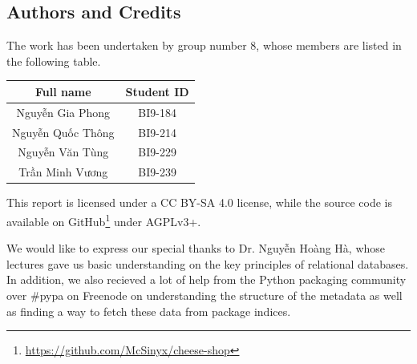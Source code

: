 \documentclass[a4paper,12pt]{article}
\begin{document}
\subsection{Authors and Credits}
The work has been undertaken by group number 8, whose members are listed
in the following table.
\begin{center}
  \begin{tabular}{c c}
    \toprule
    Full name & Student ID\\
    \midrule
    Nguyễn Gia Phong & BI9-184\\
    Nguyễn Quốc Thông & BI9-214\\
    Nguyễn Văn Tùng & BI9-229\\
    Trần Minh Vương & BI9-239\\
    \bottomrule
  \end{tabular}
\end{center}

This report is licensed under a CC BY-SA 4.0 license, while the source code is
available on GitHub\footnote{\url{https://github.com/McSinyx/cheese-shop}}
under AGPLv3+.

We would like to express our special thanks to Dr. Nguyễn Hoàng Hà,
whose lectures gave us basic understanding on the key principles of
relational databases.  In addition, we also recieved a lot of help from
the Python packaging community over \#pypa on Freenode on understanding
the structure of the metadata as well as finding a way to fetch these
data from package indices.

\newpage
{}
\end{document}
